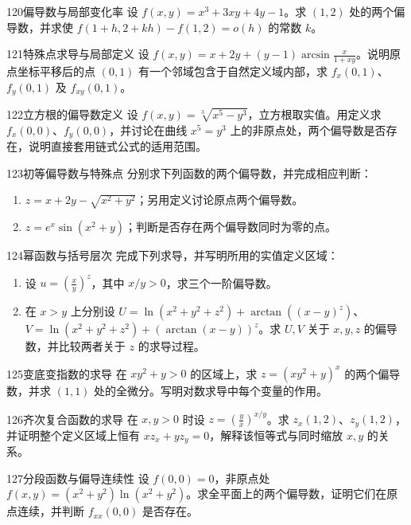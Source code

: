 \begin{exercise}{120}{偏导数与局部变化率}
设 $f(x,y)=x^3+3xy+4y-1$。求 $(1,2)$ 处的两个偏导数，并求使 $f(1+h,2+kh)-f(1,2)=o(h)$ 的常数 $k$。
\end{exercise}
\begin{exercise}{121}{特殊点求导与局部定义}
设 $f(x,y)=x+2y+(y-1)\arcsin\frac{x}{1+xy}$。说明原点坐标平移后的点 $(0,1)$ 有一个邻域包含于自然定义域内部，求 $f_x(0,1)$、$f_y(0,1)$ 及 $f_{xy}(0,1)$。
\end{exercise}
\begin{exercise}{122}{立方根的偏导数定义}
设 $f(x,y)=\sqrt[3]{x^5-y^3}$，立方根取实值。用定义求 $f_x(0,0)$、$f_y(0,0)$，并讨论在曲线 $x^5=y^3$ 上的非原点处，两个偏导数是否存在，说明直接套用链式公式的适用范围。
\end{exercise}
\begin{exercise}{123}{初等偏导数与特殊点}
分别求下列函数的两个偏导数，并完成相应判断：
\begin{enumerate}
\item $z=x+2y-\sqrt{x^2+y^2}$；另用定义讨论原点两个偏导数。
\item $z=e^x\sin(x^2+y)$；判断是否存在两个偏导数同时为零的点。
\end{enumerate}
\end{exercise}
\begin{exercise}{124}{幂函数与括号层次}
完成下列求导，并写明所用的实值定义区域：
\begin{enumerate}
\item 设 $u=(\frac xy)^z$，其中 $x/y>0$，求三个一阶偏导数。
\item 在 $x>y$ 上分别设 $U=\ln(x^2+y^2+z^2)+\arctan((x-y)^z)$、$V=\ln(x^2+y^2+z^2)+(\arctan(x-y))^z$。求 $U,V$ 关于 $x,y,z$ 的偏导数，并比较两者关于 $z$ 的求导过程。
\end{enumerate}
\end{exercise}
\begin{exercise}{125}{变底变指数的求导}
在 $xy^2+y>0$ 的区域上，求 $z=(xy^2+y)^x$ 的两个偏导数，并求 $(1,1)$ 处的全微分。写明对数求导中每个变量的作用。
\end{exercise}
\begin{exercise}{126}{齐次复合函数的求导}
在 $x,y>0$ 时设 $z=(\frac yx)^{x/y}$。求 $z_x(1,2)$、$z_y(1,2)$，并证明整个定义区域上恒有 $xz_x+yz_y=0$，解释该恒等式与同时缩放 $x,y$ 的关系。
\end{exercise}
\begin{exercise}{127}{分段函数与偏导连续性}
设 $f(0,0)=0$，非原点处 $f(x,y)=(x^2+y^2)\ln(x^2+y^2)$。求全平面上的两个偏导数，证明它们在原点连续，并判断 $f_{xx}(0,0)$ 是否存在。
\end{exercise}
